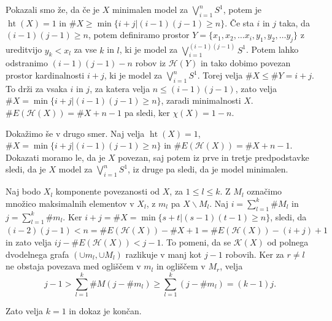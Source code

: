 \documentclass[mat1]{fmfdelo}
\DeclareRobustCommand{\h}{
    \mathcal{H}}
\DeclareMathOperator*{\htt}{ht}
\begin{document}
\begin{dokaz}
    Pokazali smo že, da če je $X$ minimalen model za $\bigvee\limits_{i=1}^{n}S^1$, potem je $\htt(X)=1$ in $\#X\geq\min\{i+j|(i-1)(j-1)\geq n\}$. 
    Če sta $i$ in $j$ taka, da $(i-1)(j-1)\geq n$, potem definiramo prostor $Y=\{x_1,x_2, \ldots x_i,y_1,y_2, \ldots y_j\}$ z ureditvijo $y_k<x_l$ 
    za vse $k$ in $l$, ki je model za $\bigvee\limits_{i=1}^{(i-1)(j-1)}S^1$. Potem lahko odstranimo $(i-1)(j-1)-n$ robov iz $\h(Y)$ in tako dobimo povezan prostor kardinalnosti $i+j$, ki je model za $\bigvee\limits_{i=1}^{n}S^1$. Torej velja  $\#X\leq \#Y=i+j$. To drži za vsaka $i$ in $j$, za katera velja $n\leq (i-1)(j-1)$, zato velja  $\#X=\min\{i+j|(i-1)(j-1)\geq n\}$, zaradi minimalnosti $X$. $\#E(\h(X))= \#X + n -1$ pa sledi, ker $\chi(X)= 1-n$.

    Dokažimo še v drugo smer. Naj velja  $\htt(X)=1$, $\#X=\min\{i+j|(i-1)(j-1)\geq n\}$ in $\#E(\h(X))= \#X + n -1.$ Dokazati moramo le, da je $X$ povezan, saj potem iz prve in tretje predpodstavke sledi, da je $X$ model za  $\bigvee\limits_{i=1}^{n}S^1$, iz druge pa sledi, da je model minimalen.

    Naj bodo $X_l$ komponente povezanosti od $X$, za $1\leq l \leq k$. Z $M_l$ označimo množico maksimalnih elementov v $X_l$, z $m_l$ pa $X\backslash M_l$. Naj $i= \sum\limits_{l=1}^k \# M_l$ in $j= \sum\limits_{l=1}^k \# m_l$. Ker $i+j=\# X =\min \{s+t|(s-1)(t-1)\geq n\}$, sledi, da $(i-2)(j-1)<n=\# E(\h(X))-\# X +1=\#E(\h(X)) -(i+j) +1$ in zato velja $ij -\# E(\h(X))<j-1$. To pomeni, da se $\mathcal{K}(X)$ od polnega dvodelnega grafa $(\cup m_l,\cup M_l)$
    razlikuje v manj kot $j-1$ robovih. Ker za $r\neq l$ ne obstaja povezava med ogliščem v $m_l$ in ogliščem v $M_r$, velja
    $$
        j-1>\sum\limits_{l=1}^{k}\# M(j- \# m_l)\geq \sum\limits_{l=1}^{k}(j- \# m_l)=(k-1)j.
    $$

    Zato velja $k=1$ in dokaz je končan.
\end{dokaz}
\end{document}
